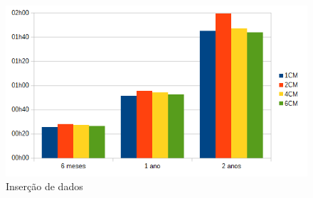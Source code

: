 \begin{figure}[!htb]
	\centering
	\includegraphics[width=1\textwidth]{figuras/graphinsert.png}
	\caption{Inserção de dados}
	\label{fig:graphinsert}
\end{figure}

